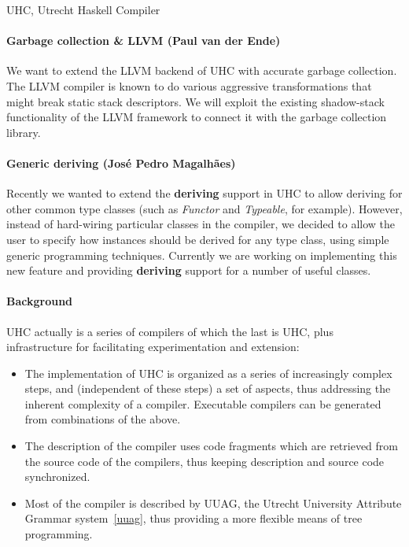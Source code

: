 \begin{hcarentry}{UHC, Utrecht Haskell Compiler}
\paragraph{Garbage collection \& LLVM (Paul van der Ende)}
We want to extend the LLVM backend of UHC with accurate garbage
collection. The LLVM compiler is known to do various aggressive
transformations that might break static stack descriptors. We will
exploit the existing shadow-stack functionality of the LLVM framework
to connect it with the garbage collection library.

\paragraph{Generic deriving (Jos\'e Pedro Magalh\~aes)}
Recently we wanted to extend the \textbf{deriving} support in UHC to allow 
deriving for other common type classes (such as \textit{Functor} and 
\textit{Typeable}, for example). However, instead of hard-wiring particular 
classes in the compiler, we decided to allow the user to specify how instances 
should be derived for any type class, using simple generic programming 
techniques. Currently we are working on implementing this new feature and 
providing \textbf{deriving} support for a number of useful classes.

\paragraph{Background}

UHC actually is a series of compilers of which the last is UHC, plus
infrastructure for facilitating experimentation and extension:

\begin{itemize}
\item
  The implementation of UHC is organized as a series of
  increasingly complex steps, and (independent of these steps) a set of aspects,
  thus addressing the inherent complexity of a compiler.
  Executable compilers can be generated from combinations of the above.
\item
  The description of the compiler uses code fragments which are
  retrieved from the source code of the compilers, thus
  keeping description and source code synchronized.
\item
  Most of the compiler is described by UUAG, the Utrecht University Attribute Grammar system~\cref{uuag},
  thus providing a more flexible means of tree programming.
\end{itemize}


\end{hcarentry}
